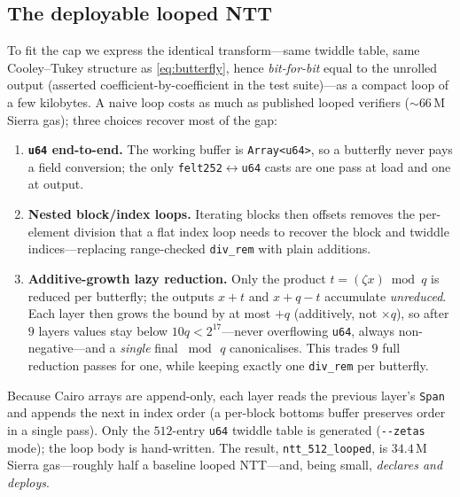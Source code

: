 \documentclass[11pt]{article}
\begin{document}
\subsection{The deployable looped NTT}\label{sec:looped}
To fit the cap we express the identical transform---same twiddle table, same Cooley--Tukey
structure as \eqref{eq:butterfly}, hence \emph{bit-for-bit} equal to the unrolled output (asserted
coefficient-by-coefficient in the test suite)---as a compact loop of a few kilobytes. A naive loop
costs as much as published looped verifiers ($\sim$66\,M Sierra gas); three choices recover most of
the gap:
\begin{enumerate}
\item \textbf{\texttt{u64} end-to-end.} The working buffer is \texttt{Array<u64>}, so a butterfly
never pays a field conversion; the only \texttt{felt252}$\leftrightarrow$\texttt{u64} casts are one
pass at load and one at output.
\item \textbf{Nested block/index loops.} Iterating blocks then offsets removes the per-element
division that a flat index loop needs to recover the block and twiddle indices---replacing
range-checked \texttt{div\_rem} with plain additions.
\item \textbf{Additive-growth lazy reduction.} Only the product $t=(\zeta x)\bmod q$ is reduced per
butterfly; the outputs $x{+}t$ and $x{+}q{-}t$ accumulate \emph{unreduced}. Each layer then grows
the bound by at most $+q$ (additively, not $\times q$), so after $9$ layers values stay below
$10q<2^{17}$---never overflowing \texttt{u64}, always non-negative---and a \emph{single} final
$\bmod\,q$ canonicalises. This trades $9$ full reduction passes for one, while keeping exactly one
\texttt{div\_rem} per butterfly.
\end{enumerate}
Because Cairo arrays are append-only, each layer reads the previous layer's \texttt{Span} and
appends the next in index order (a per-block bottoms buffer preserves order in a single pass). Only
the $512$-entry \texttt{u64} twiddle table is generated (\verb|--zetas| mode); the loop body is
hand-written. The result, \texttt{ntt\_512\_looped}, is $34.4$\,M Sierra gas---roughly half a
baseline looped NTT---and, being small, \emph{declares and deploys}.
\end{document}
